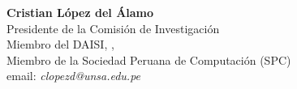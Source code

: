 \begin{center}
\textbf{Cristian López del Álamo}\\
Presidente de la Comisión de Investigación\\
Miembro del DAISI, \University, \city\\
Miembro de la Sociedad Peruana de Computación (SPC)\\
email: \textit{clopezd@unsa.edu.pe}
\end{center}

